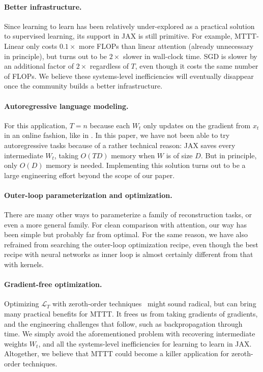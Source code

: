 \documentclass{article}
\newcommand{\scrL}{\mathcal{L}}
\begin{document}
\paragraph{Better infrastructure.}
Since learning to learn has been relatively under-explored as a practical solution to supervised learning, its support in JAX is still primitive.
For example, MTTT-Linear only costs $0.1\times$ more FLOPs than linear attention (already unnecessary in principle), but turns out to be $2\times$ slower in wall-clock time.
SGD is slower by an additional factor of $2\times$ regardless of $T$, even though it costs the same number of FLOPs.
We believe these systems-level inefficiencies will eventually disappear once the community builds a better infrastructure.

\paragraph{Autoregressive language modeling.}
For this application, $T=n$ because each $W_t$ only updates on the gradient from $x_t$ in an online fashion, like in \cite{wang2023test}.
In this paper, we have not been able to try autoregressive tasks because of a rather technical reason:
JAX saves every intermediate $W_t$, taking $O(TD)$ memory when $W$ is of size $D$.
But in principle, only $O(D)$ memory is needed. 
Implementing this solution turns out to be a large engineering effort beyond the scope of our paper.

\paragraph{Outer-loop parameterization and optimization.}
There are many other ways to parameterize a family of reconstruction tasks, or even a more general family.
For clean comparison with attention, our way has been simple but probably far from optimal.
For the same reason, we have also refrained from searching the outer-loop optimization recipe, even though the best recipe with neural networks as inner loop is almost certainly different from that with kernels.

\paragraph{Gradient-free optimization.} Optimizing $\scrL_T$ with zeroth-order techniques~\citep{salimans2017evolution, hinton2022forward, malladi2023fine} might sound radical, but can bring many practical benefits for MTTT.
It frees us from taking gradients of gradients, and the engineering challenges that follow, such as backpropagation through time.
We simply avoid the aforementioned problem with recovering intermediate weights $W_t$, and all the systems-level inefficiencies for learning to learn in JAX.
Altogether, we believe that MTTT could become a killer application for zeroth-order techniques. 
\end{document}
